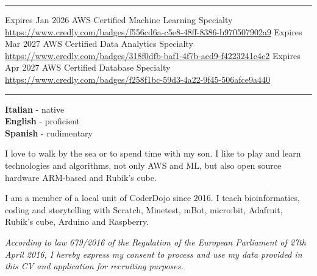 \documentclass[8pt]{stackoverflow-upgraded-version} %
\begin{document}
\textcolor{stackoverflow}{\hrule}
\vspace{\baselineskip} %
\begin{entrylist}
	\entry
		{Expires Jan 2026}
		{AWS Certified Machine Learning}
		{Specialty}
		{\href{https://www.credly.com/badges/f556cd6a-c5e8-48ff-8386-b970507902a9}{https://www.credly.com/badges/f556cd6a-c5e8-48ff-8386-b970507902a9}}
	\entry
		{Expires Mar 2027}
		{AWS Certified Data Analytics}
		{Specialty}
		{\href{https://www.credly.com/badges/318f0dfb-baf1-4f7b-aed9-f4223241e4c2}{https://www.credly.com/badges/318f0dfb-baf1-4f7b-aed9-f4223241e4c2}}
	\entry
		{Expires Apr 2027}
		{AWS Certified Database}
		{Specialty}
		{\href{https://www.credly.com/badges/f258f1bc-59d3-4a22-9f45-506afce9a440}{https://www.credly.com/badges/f258f1bc-59d3-4a22-9f45-506afce9a440}}
\end{entrylist}


\textcolor{stackoverflow}{\hrule}
\vspace{\baselineskip} %
\begin{minipage}[t]{0.2\textwidth}

	\textbf{Italian} - native\\
	\textbf{English} - proficient\\
	\textbf{Spanish} - rudimentary
\end{minipage}
\hfill
\begin{minipage}[t]{0.35\textwidth}

	I love to walk by the sea or to spend time with my son.
	I like to play and learn technologies and algorithms, not only AWS and ML,
	but also open source hardware ARM-based and Rubik's cube.
\end{minipage}
\hfill
\begin{minipage}[t]{0.35\textwidth}

	I am a member of a local unit of CoderDojo since 2016.
	I teach bioinformatics, coding and storytelling with
	Scratch, Minetest, mBot, micro:bit, Adafruit, Rubik's cube, Arduino and Raspberry.\\
\end{minipage}

\vfill
\emph{\footnotesize According to law 679/2016 of the Regulation of the European Parliament of 27th April 2016, I hereby express my consent to process
and use my data provided in this CV and application for recruiting purposes.}
\end{document}
